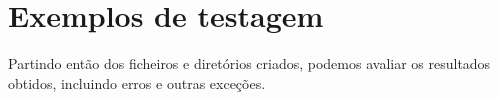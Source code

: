 \section{Exemplos de testagem}

Partindo então dos ficheiros e diretórios criados, podemos avaliar os resultados obtidos, incluindo erros e outras
exceções.
